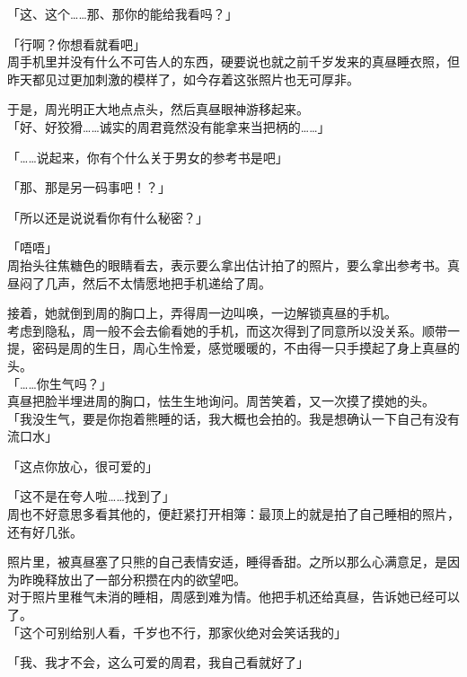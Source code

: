 「这、这个……那、那你的能给我看吗？」

「行啊？你想看就看吧」\\

周手机里并没有什么不可告人的东西，硬要说也就之前千岁发来的真昼睡衣照，但昨天都见过更加刺激的模样了，如今存着这张照片也无可厚非。

于是，周光明正大地点点头，然后真昼眼神游移起来。\\

「好、好狡猾……诚实的周君竟然没有能拿来当把柄的……」

「……说起来，你有个什么关于男女的参考书是吧」

「那、那是另一码事吧！？」

「所以还是说说看你有什么秘密？」

「唔唔」\\

周抬头往焦糖色的眼睛看去，表示要么拿出估计拍了的照片，要么拿出参考书。真昼闷了几声，然后不太情愿地把手机递给了周。

接着，她就倒到周的胸口上，弄得周一边叫唤，一边解锁真昼的手机。\\

考虑到隐私，周一般不会去偷看她的手机，而这次得到了同意所以没关系。顺带一提，密码是周的生日，周心生怜爱，感觉暖暖的，不由得一只手摸起了身上真昼的头。\\

「……你生气吗？」\\

真昼把脸半埋进周的胸口，怯生生地询问。周苦笑着，又一次摸了摸她的头。\\

「我没生气，要是你抱着熊睡的话，我大概也会拍的。我是想确认一下自己有没有流口水」

「这点你放心，很可爱的」

「这不是在夸人啦……找到了」\\

周也不好意思多看其他的，便赶紧打开相簿：最顶上的就是拍了自己睡相的照片，还有好几张。

照片里，被真昼塞了只熊的自己表情安适，睡得香甜。之所以那么心满意足，是因为昨晚释放出了一部分积攒在内的欲望吧。\\

对于照片里稚气未消的睡相，周感到难为情。他把手机还给真昼，告诉她已经可以了。\\

「这个可别给别人看，千岁也不行，那家伙绝对会笑话我的」

「我、我才不会，这么可爱的周君，我自己看就好了」

